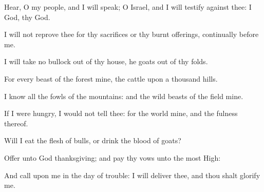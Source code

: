 {\Q {}Hear, O my
people, and I will
speak; O
Israel, and I will
testify against thee: I
{}
God,
{} thy
God.


\par }{\Q {}I will not
reprove thee for thy
sacrifices or thy burnt
offerings,
{}
continually before me.


\par }{\Q {}I will
take no
bullock out of thy
house,
{} he
goats out of thy
folds.


\par }{\Q {}For every
beast of the
forest
{} mine,
{} the
cattle upon a
thousand
hills.


\par }{\Q {}I
know all the
fowls of the
mountains: and the wild
beasts of the
field
{}
mine.


\par }{\Q {}If I were
hungry, I would not
tell thee: for the
world
{} mine, and the
fulness thereof.


\par }{\Q {}Will I
eat the
flesh of
bulls, or
drink the
blood of
goats?


\par }{\Q {}Offer unto
God
thanksgiving; and
pay thy
vows unto the most
High:


\par }{\Q {}And
call upon me in the
day of
trouble: I will
deliver thee, and thou shalt
glorify me.


\par }{\BB \par }
